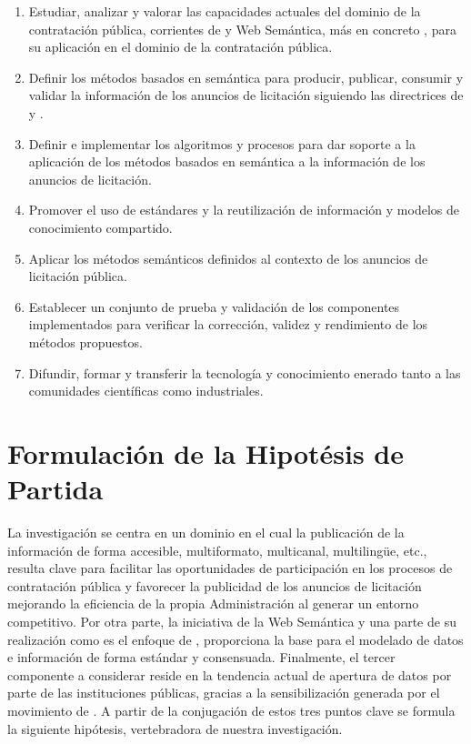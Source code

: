 \documentclass[a4paper,final,11pt,fleqn,twoside]{book}  %
\begin{document}
\begin{enumerate}
\item Estudiar, analizar y valorar las capacidades actuales del dominio de la contratación pública, 
corrientes de \opendata y Web Semántica, más en concreto \linkeddata, para su aplicación en el dominio de la contratación pública.%
 \item Definir los métodos basados en semántica para producir, publicar, consumir y validar 
la información de los anuncios de licitación siguiendo las directrices de \opendata y \linkeddata. %
 \item Definir e implementar los algoritmos y procesos para dar soporte a la aplicación de los métodos basados en semántica 
a la información de los anuncios de licitación.
\item Promover el uso de estándares y la reutilización de información y modelos de conocimiento compartido.%
\item Aplicar los métodos semánticos definidos al contexto de los anuncios de licitación pública.%
\item Establecer un conjunto de prueba y validación de los componentes implementados para verificar la corrección, 
 validez y rendimiento de los métodos propuestos.%
\item Difundir, formar y transferir la tecnología y conocimiento enerado tanto a las comunidades científicas como industriales.%
\end{enumerate}


\section{Formulación de la Hipotésis de Partida}
La investigación se centra en un dominio en el cual la publicación de la información de forma accesible, multiformato, multicanal, multiling\"{u}e, etc., 
resulta clave para facilitar las oportunidades de participación en los procesos de contratación pública y favorecer la publicidad
de los anuncios de licitación mejorando la eficiencia de la propia Administración al generar un entorno
competitivo. Por otra parte, la iniciativa de la Web Semántica y una parte de su realización como es el enfoque
de \linkeddata, proporciona la base para el modelado de datos e información de forma estándar y consensuada. Finalmente, el tercer
componente a considerar reside en la tendencia actual de apertura de datos por parte de las instituciones públicas, gracias
a la sensibilización generada por el movimiento de \opendata. A partir de la conjugación de estos tres puntos clave se formula
la siguiente hipótesis, vertebradora de nuestra investigación.
\end{document}
